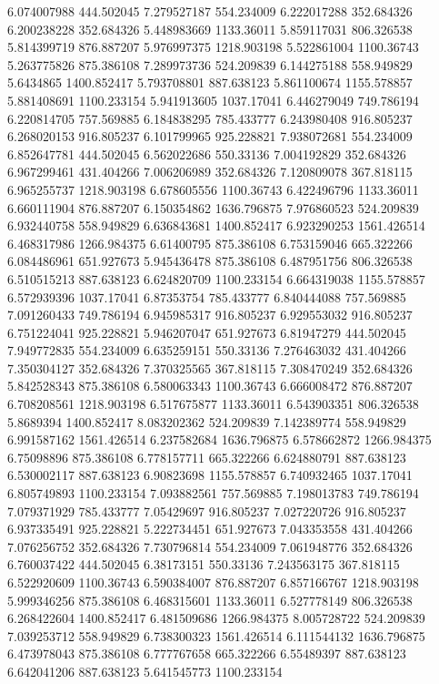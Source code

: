 6.074007988	444.502045
7.279527187	554.234009
6.222017288	352.684326
6.200238228	352.684326
5.448983669	1133.36011
5.859117031	806.326538
5.814399719	876.887207
5.976997375	1218.903198
5.522861004	1100.36743
5.263775826	875.386108
7.289973736	524.209839
6.144275188	558.949829
5.6434865	1400.852417
5.793708801	887.638123
5.861100674	1155.578857
5.881408691	1100.233154
5.941913605	1037.17041
6.446279049	749.786194
6.220814705	757.569885
6.184838295	785.433777
6.243980408	916.805237
6.268020153	916.805237
6.101799965	925.228821
7.938072681	554.234009
6.852647781	444.502045
6.562022686	550.33136
7.004192829	352.684326
6.967299461	431.404266
7.006206989	352.684326
7.120809078	367.818115
6.965255737	1218.903198
6.678605556	1100.36743
6.422496796	1133.36011
6.660111904	876.887207
6.150354862	1636.796875
7.976860523	524.209839
6.932440758	558.949829
6.636843681	1400.852417
6.923290253	1561.426514
6.468317986	1266.984375
6.61400795	875.386108
6.753159046	665.322266
6.084486961	651.927673
5.945436478	875.386108
6.487951756	806.326538
6.510515213	887.638123
6.624820709	1100.233154
6.664319038	1155.578857
6.572939396	1037.17041
6.87353754	785.433777
6.840444088	757.569885
7.091260433	749.786194
6.945985317	916.805237
6.929553032	916.805237
6.751224041	925.228821
5.946207047	651.927673
6.81947279	444.502045
7.949772835	554.234009
6.635259151	550.33136
7.276463032	431.404266
7.350304127	352.684326
7.370325565	367.818115
7.308470249	352.684326
5.842528343	875.386108
6.580063343	1100.36743
6.666008472	876.887207
6.708208561	1218.903198
6.517675877	1133.36011
6.543903351	806.326538
5.8689394	1400.852417
8.083202362	524.209839
7.142389774	558.949829
6.991587162	1561.426514
6.237582684	1636.796875
6.578662872	1266.984375
6.75098896	875.386108
6.778157711	665.322266
6.624880791	887.638123
6.530002117	887.638123
6.90823698	1155.578857
6.740932465	1037.17041
6.805749893	1100.233154
7.093882561	757.569885
7.198013783	749.786194
7.079371929	785.433777
7.05429697	916.805237
7.027220726	916.805237
6.937335491	925.228821
5.222734451	651.927673
7.043353558	431.404266
7.076256752	352.684326
7.730796814	554.234009
7.061948776	352.684326
6.760037422	444.502045
6.38173151	550.33136
7.243563175	367.818115
6.522920609	1100.36743
6.590384007	876.887207
6.857166767	1218.903198
5.999346256	875.386108
6.468315601	1133.36011
6.527778149	806.326538
6.268422604	1400.852417
6.481509686	1266.984375
8.005728722	524.209839
7.039253712	558.949829
6.738300323	1561.426514
6.111544132	1636.796875
6.473978043	875.386108
6.777767658	665.322266
6.55489397	887.638123
6.642041206	887.638123
5.641545773	1100.233154
